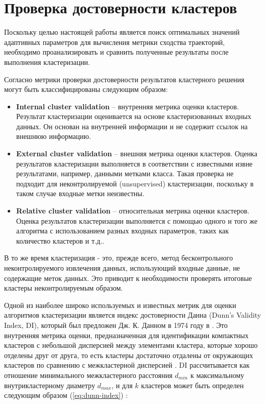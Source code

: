 \section{Проверка достоверности кластеров}

Поскольку целью настоящей работы является поиск оптимальных значений адаптивных параметров для вычисления метрики сходства траекторий, необходимо проанализировать и сравнить полученные результаты после выполнения кластеризации.

Согласно \cite{online:dunn_cl_valid} метрики проверки достоверности результатов кластерного решения могут быть классифицированы следующим образом:
\begin{itemize}
	\item \textbf{Internal cluster validation} -- внутренняя метрика оценки кластеров. Результат кластеризации оценивается на основе кластеризованных входных данных. Он основан на внутренней информации и не содержит ссылок на внешнюю информацию.
	\item \textbf{External cluster validation} -- внешняя метрика оценки кластеров. Оценка результатов кластеризации выполняется в соответствии с известными извне результатами, например, данными метками класса. Такая проверка не подходит для неконтролируемой (unsupervised) кластеризации, поскольку в таком случае входные метки неизвестны.
	\item \textbf{Relative cluster validation} -- относительная метрика оценки кластеров. Оценка результатов кластеризации выполняется с помощью одного и того же алгоритма с использованием разных входных параметров, таких как количество кластеров и т.д..
\end{itemize}

В то же время кластеризация - это, прежде всего, метод бесконтрольного неконтролируемого извлечения данных, использующий входные данные, не содержащие меток данных. Это приводит к необходимости проверять итоговые кластеры неконтролируемым образом.

Одной из наиболее широко используемых и известных метрик для оценки алгоритмов кластеризации является индекс достоверности Данна (Dunn's Validity Index, DI), который был предложен Дж. К. Данном в 1974 году в \cite{article:dunn_orig}. Это внутренняя метрика оценки, предназначенная для идентификации компактных кластеров с небольшой дисперсией между элементами кластера, которые хорошо отделены друг от друга, то есть кластеры достаточно отдалены от окружающих кластеров по сравнению с межкластерной дисперсией \cite{online:hier_clust_r}. DI рассчитывается как отношение минимального межкластерного расстояния $d_{min}$ к максимальному внутрикластерному диаметру $d_{max}$, и для $k$ кластеров может быть определен следующим образом (\ref{eq:dunn-index}) \cite{article:quant_eval_perf_clust}:

